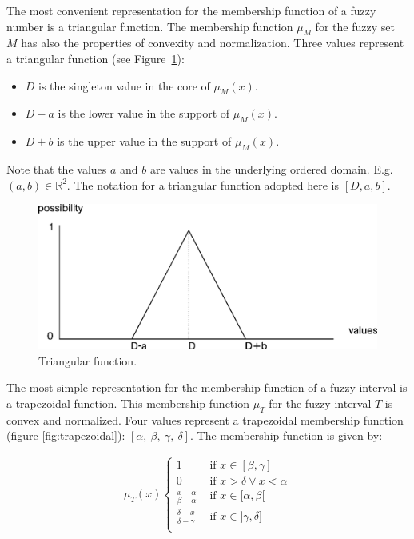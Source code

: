The most convenient representation for the membership function of a fuzzy number is a triangular function. The membership function $\mu_M$ for the fuzzy set $M$ has also the properties of convexity and normalization. Three values represent a triangular function (see Figure~\ref{fig:triangular}):
\begin{itemize}
\item
$D$ is the singleton value in the core of $\mu_M(x)$.
\item
$D-a$ is the lower value in the support of $\mu_M(x)$. 
\item
$D+b$ is the upper value in the support of $\mu_M(x)$.
\end{itemize}
Note that the values $a$ and $b$ are values in the underlying ordered domain. E.g. $(a,b) \in \mathbb{R}^2$. The notation for a triangular function adopted here is $[D,a,b]$.
\begin{figure}[h!]
  \centering
  \includegraphics[scale=0.4]{graphs/triangular.eps}
  \caption{Triangular function.}
  \label{fig:triangular}
\end{figure}

The most simple representation for the membership function of a fuzzy interval is a trapezoidal function. This membership function $\mu_T$ for the fuzzy interval $T$ is convex and normalized. Four values represent a trapezoidal membership function (figure  \ref{fig:trapezoidal}): $\left[\alpha,\ \beta,\ \gamma,\ \delta\right]$. The membership function is given by:

\begin{align}
\mu_T(x)
\begin{cases}
1 & \mbox{ if } x \in [\beta,\gamma] \\
0 & \mbox{ if } x > \delta \vee x < \alpha \\
\frac{x-\alpha}{\beta - \alpha} & \mbox{ if } x \in [\alpha,\beta[ \\
\frac{\delta -x}{\delta - \gamma} & \mbox{ if } x \in ]\gamma,\delta] \\
\end{cases}
\end{align}

